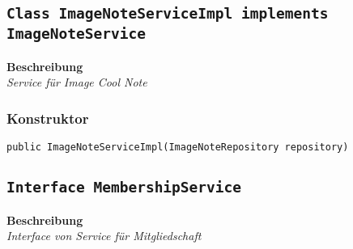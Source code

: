     \subsection{\texttt{Class ImageNoteServiceImpl implements ImageNoteService}}
    \textbf{Beschreibung} \\
    \textit{Service für Image Cool Note}
    \subsubsection*{Konstruktor}
    \texttt{public ImageNoteServiceImpl(ImageNoteRepository repository)}
    \subsection{\texttt{Interface MembershipService}}
    \textbf{Beschreibung} \\
    \textit{Interface von Service für Mitgliedschaft}
